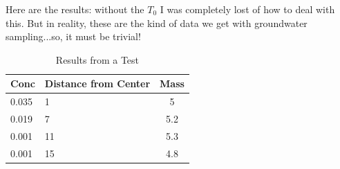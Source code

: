 \documentclass{article}
\begin{document}
\begin{figure}
	\label{fig:IMG_0576}
\end{figure}

\begin{figure}
	\label{fig:IMG_0579}
\end{figure}


\begin{figure}
	\label{fig:IMG_0577}
\end{figure}

Here are the results: without the $T_0$ I was completely lost of how to deal with this. But in reality, these are the kind of data we get with groundwater sampling...so, it must be trivial!


\begin{table}
	\begin{tabular}{llc} \hline
Conc		&		Distance from Center	&	Mass \\ \hline\hline
0.035		& 	1				& 5		\\
0.019		&		7				& 5.2 \\
0.001		& 	11			&	5.3	\\
0.001	  & 	15			&	4.8	\\ \hline
	\end{tabular}
	\caption{Results from a Test}
	\label{tab:ResultsFromATest}
\end{table}
\end{document}
